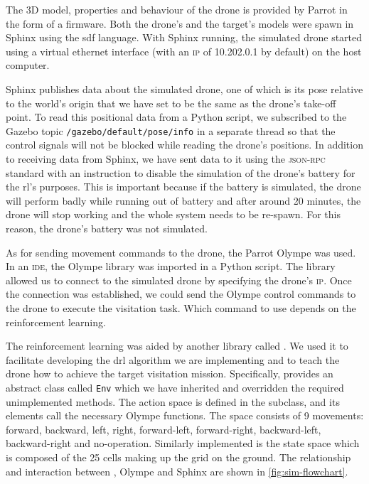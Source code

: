 \documentclass[../main.tex]{subfiles}
\begin{document}
The 3D model, properties and behaviour
of the \anafi drone is provided by Parrot in the 
form of a firmware. 
Both the drone's and the target's models were spawn
in Sphinx using the \gls{sdf} language.
With Sphinx running, the simulated \anafi drone 
started using
a virtual ethernet interface 
(with an \textsc{ip} of 10.202.0.1 by default) 
on the host computer.

Sphinx publishes data about the simulated drone,
one of which is its pose relative to
the world's origin that we have set to be the same
as the drone's take-off point. 
To read this positional data from a Python script, we 
subscribed to the Gazebo topic 
\texttt{/gazebo\-/default\-/pose\-/info}
in a separate thread so that the control signals
will not be blocked while reading the drone's positions.
In addition to receiving data from Sphinx, we have 
sent data to it using the \textsc{json-rpc} standard
with an instruction to disable
the simulation of the \anafi drone's battery
for the \gls{rl}'s purposes. This is important because
if the battery is simulated, the drone will 
perform badly while running
out of battery and after around 20 minutes, 
the drone will stop working and the whole system
needs to be re-spawn. For this reason, the drone's
battery was not simulated.

As for sending movement commands to the drone,
the Parrot Olympe was used.
In an \textsc{ide}, the Olympe library was imported
in a Python script. The library allowed us to connect
to the simulated drone by specifying the drone's
\textsc{ip}. Once the connection was established, 
we could send the Olympe control commands to the drone
to execute the visitation task. Which command to use
depends on the reinforcement learning.

The reinforcement learning was aided 
by another library called \gym.
We used it to facilitate developing the
\gls{drl} algorithm we are implementing and to 
teach the drone how to achieve the 
target visitation mission.
Specifically, \gym provides an abstract class 
called \texttt{Env}
which we have inherited and overridden the 
required unimplemented methods.
The action space is defined in the subclass, and its
elements call the necessary Olympe functions. 
The space consists of 9 movements: 
forward, backward, left,
right, forward-left, forward-right, backward-left,
backward-right and no-operation.
Similarly implemented is the state space 
which is composed of the 25 cells
making up the grid on the ground. 
The relationship and interaction between \gym, Olympe
and Sphinx are shown in \cref{fig:sim-flowchart}.
\end{document}
